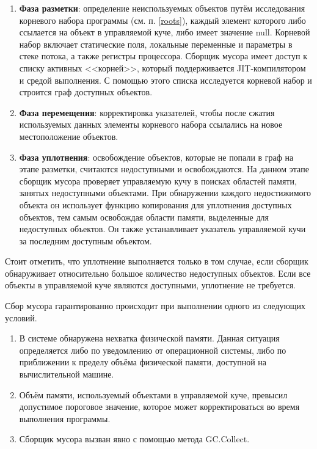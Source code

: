 \begin{enumerate}[label*=\arabic*.]
	\item \textbf{Фаза разметки}: определение неиспользуемых объектов путём исследования корневого набора программы (см. п. \ref{roots}), каждый элемент которого либо ссылается на объект в управляемой куче, либо имеет значение null. Корневой набор включает статические поля, локальные переменные и параметры в стеке потока, а также регистры процессора. Сборщик мусора имеет доступ к списку активных <<корней>>, который поддерживается JIT-компилятором и средой выполнения. С помощью этого списка исследуется корневой набор и строится граф доступных объектов.
	\item \textbf{Фаза перемещения}: корректировка указателей, чтобы после сжатия используемых данных элементы корневого набора ссылались на новое местоположение объектов.
	\item \textbf{Фаза уплотнения}: освобождение объектов, которые не попали в граф на этапе разметки, считаются недоступными и освобождаются. На данном этапе сборщик мусора проверяет управляемую кучу в поисках областей памяти, занятых недоступными объектами. При обнаружении каждого недостижимого объекта он использует функцию копирования для уплотнения доступных объектов, тем самым освобождая области памяти, выделенные для недоступных объектов. Он также устанавливает указатель управляемой кучи за последним доступным объектом. 
\end{enumerate}

Стоит отметить, что уплотнение выполняется только в том случае, если сборщик обнаруживает относительно большое количество недоступных объектов. Если все объекты в управляемой куче являются доступными, уплотнение не требуется. \cite{dotnet_gc}

Сбор мусора гарантированно происходит при выполнении одного из следующих условий. \cite{dotnet_gc}

\begin{enumerate}[label*=\arabic*.]
	\item В системе обнаружена нехватка физической памяти. Данная ситуация определяется либо по уведомлению от операционной системы, либо по приближении к пределу объёма физической памяти, доступной на вычислительной машине.
	\item Объём памяти, используемый объектами в управляемой куче, превысил допустимое пороговое значение, которое может корректироваться во время выполнения программы.
	\item Сборщик мусора вызван явно с помощью метода GC.Collect.
\end{enumerate}

